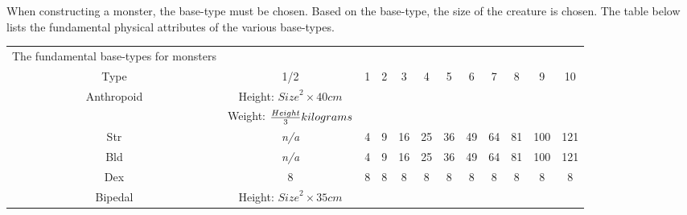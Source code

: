 \documentclass[twoside]{book}
\begin{document}
    {  
    When constructing a monster, the base-type must be
               chosen. Based on the base-type, the size of the creature
               is chosen. The table below lists the fundamental physical
               attributes of the various base-types. 
    }
  
\begin{table}[htb]
  \begin{center}

  \begin{tabular}{|c|c|c|c|c|c|c|c|c|c|c|c|}
  \hline
\textscbf{}&\textscbf{}&\textscbf{}&\textscbf{}&\textscbf{}&\textscbf{}&\textscbf{}&\textscbf{}&\textscbf{}&\textscbf{}&\textscbf{}&\textscbf{}\\
  \hline
  \hline
      
                    The fundamental base-types for monsters
                  \\

\hline

 Type & 1/2 & 1 & 2 & 3 & 4 & 5 & 6 & 7 & 8 & 9 & 10 \\

\hline

 Anthropoid &  Height: \begin{math}    
                        {Size}^{ 2 }   \times     40 
                           cm    \end{math}
                  \\

\hline

&  Weight: \begin{math}    {{
                     Height}\over{ 3 }}  kilograms
                        \end{math}
                  \\

\hline

 Str &
                    \textit{n/a}
                  & 4 & 9 & 16 & 25 & 36 & 49 & 64 & 81 & 100 & 121 \\

\hline

 Bld &
                    \textit{n/a}
                  & 4 & 9 & 16 & 25 & 36 & 49 & 64 & 81 & 100 & 121 \\

\hline

 Dex & 8 & 8 & 8 & 8 & 8 & 8 & 8 & 8 & 8 & 8 & 8 \\

\hline

 Bipedal &  Height: \begin{math}    
                        {Size}^{ 2 }   \times   35 cm
                              \end{math}
                  \\


\end{tabular}
\end{center}
\end{table}
\end{document}
